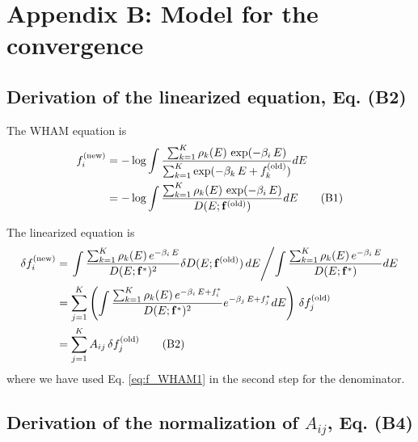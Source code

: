\documentclass[aip,jcp,preprint,notitlepage, superscriptaddress]{revtex4-1}
\begin{document}
\section{Appendix B: Model for the convergence}







\subsection{Derivation of the linearized equation, Eq. (B2)}



The WHAM equation is
%
\begin{align}
f_i^\mathrm{(new)}
&=
-\log
\int
\frac
{
  \sum_{k=1}^K \rho_k(E) \, \exp(-\beta_i \, E)
}
{
  \sum_{k=1}^K
  \exp(
    -\beta_k \, E + f_k^\mathrm{(old)}
  )
}
dE
\notag \\
&=
-\log
\int
\frac
{
  \sum_{k=1}^K \rho_k(E) \, \exp(-\beta_i \, E)
}
{
  D(E; \mathbf{f}^\mathrm{(old)})
}
dE
\tag{B1}
\label{eq:f_WHAM1}
\end{align}



The linearized equation is
\begin{align}
\delta f_i^\mathrm{(new)}
&=
\left.
  \int
  \frac
  {
    \sum_{k=1}^K \rho_k(E) \, e^{-\beta_i \, E}
  }
  {
    D(E; \vct f^*)^2
  }
  \delta D(E; \vct f^\mathrm{(old)}) \,
  dE
\middle/
  \int
  \frac
  {
    \sum_{k=1}^K \rho_k(E) \, e^{-\beta_i \, E}
  }
  {
    D(E; \vct f^*)
  }
  dE
\right.
%
\notag \\
&=
\sum_{j = 1}^K
\left(
\int
\frac
{
  \sum_{k=1}^K \rho_k(E) \, e^{-\beta_i \, E + f_i^*}
}
{
  D(E; \vct f^*)^2
}
e^{-\beta_j \, E + f_j^*}
dE
\right)
\, \delta f_j^\mathrm{(old)}
\notag \\
&=
\sum_{j = 1}^K
A_{ij} \, \delta f_j^\mathrm{(old)}
\tag{B2}
\label{eq:f_lin}
\end{align}
where we have used
Eq. \eqref{eq:f_WHAM1}
in the second step
for the denominator.





\subsection{Derivation of the normalization of $A_{ij}$, Eq. (B4)}
\end{document}
